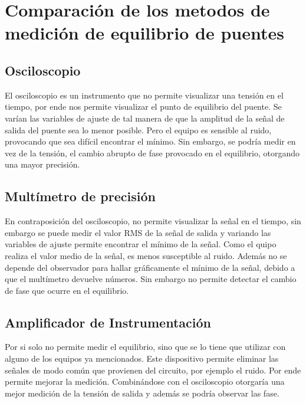 \documentclass[../../main.tex]{subfiles}
\begin{document}
\section{Comparación de los metodos  de medición de equilibrio de puentes}
\subsection*{Osciloscopio}
\par El osciloscopio es un instrumento que no permite visualizar una tensión en el tiempo, por ende nos permite visualizar el punto de equilibrio del puente. Se varían las variables de ajuste de tal manera de que la amplitud de la señal de salida del puente sea lo menor posible. Pero el equipo es sensible al ruido, provocando que sea difícil encontrar el mínimo. Sin embargo, se podría medir en vez de la tensión, el cambio abrupto de fase provocado en el equilibrio, otorgando una mayor precisión.
\subsection*{Multímetro de precisión}
\par En contraposición del osciloscopio, no permite visualizar la señal en el tiempo, sin embargo se puede medir el valor RMS de la señal de salida y variando las variables de ajuste permite encontrar el mínimo de la señal. Como el quipo realiza el valor medio de la señal, es menos susceptible al ruido. Además no se depende del observador para hallar gráficamente el mínimo de la señal, debido a que el multímetro devuelve números. Sin embargo no permite detectar el cambio de fase que ocurre en el equilibrio.
\subsection*{Amplificador de Instrumentación}
\par Por si solo no permite medir el equilibrio, sino que se lo tiene que utilizar con alguno de los equipos ya mencionados. Este dispositivo permite eliminar las señales de modo común que provienen del circuito, por ejemplo el ruido. Por ende permite mejorar la medición. Combinándose con el osciloscopio otorgaría una mejor medición de la tensión de salida y además se podría observar las fase.
\end{document}
